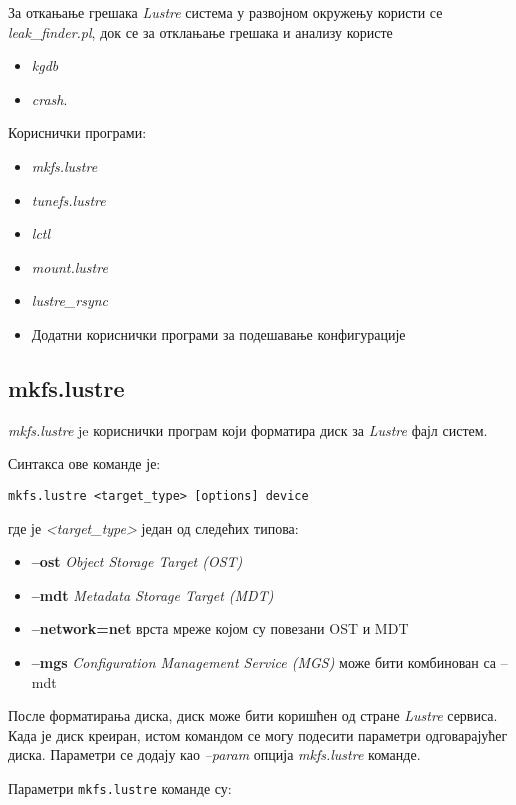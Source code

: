 За откањање грешака   \textit{Lustre}  система у развојном окружењу користи се \textit{leak\_finder.pl}, док се за отклањање грешака и анализу користе
\begin{itemize}
\item \textit{kgdb}
\item \textit{crash}.
\end{itemize}

Кориснички програми:
\begin{itemize}
\item \textit{mkfs.lustre}
\item \textit{tunefs.lustre}
\item \textit{lctl}
\item \textit{mount.lustre}
\item \textit{lustre\_rsync}
\item Додатни кориснички програми за подешавање конфигурације
\end{itemize}

\subsection{mkfs.lustre}
\textit{mkfs.lustre} je кориснички програм који форматира диск за   \textit{Lustre} фајл систем.

Синтакса ове команде је:
\begin{verbatim}
mkfs.lustre <target_type> [options] device
\end{verbatim}
где је \textit{<target\_type>} један од следећих типова:

\begin{itemize}
\item \textbf{--ost}
\textit{Object Storage Target (OST)}
\item \textbf{--mdt}
\textit{ Metadata Storage Target (MDT)}
\item \textbf{--network=net }
врста мреже којом су повезани OST и MDT
\item \textbf{--mgs }
\textit{ Configuration Management Service (MGS)} може бити комбинован са  --mdt
\end{itemize}
После форматирања диска, диск може бити коришћен од стране   \textit{Lustre} сервиса.
Када је диск креиран, истом командом се  могу подесити параметри  одговарајућег диска.
Параметри се додају као \textit{--param} опција \textit{mkfs.lustre} команде.

Параметри \texttt{mkfs.lustre} команде су:

